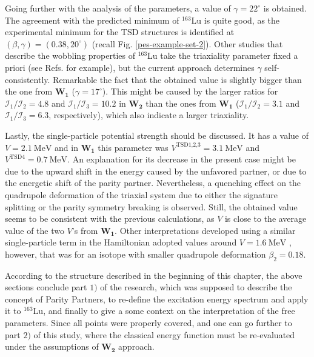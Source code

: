 Going further with the analysis of the parameters, a value of $\gamma=22^\circ$ is obtained. The agreement with the predicted minimum of $^{163}$Lu \cite{jensen2002wobbling,jensen2004coexisting} is quite good, as the experimental minimum for the TSD structures is identified at $(\beta,\gamma)=(0.38,20^\circ)$ (recall Fig. \ref{pes-example-set-2}). Other studies that describe the wobbling properties of $^{163}$Lu take the triaxiality parameter fixed a priori (see Refs. \cite{tanabe2006algebraic,tanabe2017stability} for example), but the current approach determines $\gamma$ self-consistently. Remarkable the fact that the obtained value is slightly bigger than the one from $\mathbf{W_1}$ ($\gamma=17^\circ$). This might be caused by the larger ratios for $\mathcal{I}_1/\mathcal{I}_2=4.8$ and $\mathcal{I}_1/\mathcal{I}_3=10.2$ in $\mathbf{W_2}$ than the ones from $\mathbf{W_1}$ ($\mathcal{I}_1/\mathcal{I}_2=3.1$ and $\mathcal{I}_1/\mathcal{I}_3=6.3$, respectively), which also indicate a larger triaxiality.

Lastly, the single-particle potential strength should be discussed. It has a value of $V=2.1\ \text{MeV}$ and in $\mathbf{W_1}$ this parameter was $V^{\text{TSD1,2,3}}=3.1\ \text{MeV}$ and $V^\text{TSD4}=0.7\ \text{MeV}$. An explanation for its decrease in the present case might be due to the upward shift in the energy caused by the unfavored partner, or due to the energetic shift of the parity partner. Nevertheless, a quenching effect on the quadrupole deformation of the triaxial system due to either the signature splitting or the parity symmetry breaking is observed. Still, the obtained value seems to be consistent with the previous calculations, as $V$ is close to the average value of the two $V$'s from $\mathbf{W_1}$. Other interpretations developed using a similar single-particle term in the Hamiltonian adopted values around $V=1.6\ \text{MeV}$ \cite{tanabe2017stability}, however, that was for an isotope with smaller quadrupole deformation $\beta_2=0.18$.

According to the structure described in the beginning of this chapter, the above sections conclude part $1)$ of the research, which was supposed to describe the concept of Parity Partners, to re-define the excitation energy spectrum and apply it to $^{163}$Lu, and finally to give a some context on the interpretation of the free parameters. Since all points were properly covered, and one can go further to part $2)$ of this study, where the classical energy function must be re-evaluated under the assumptions of $\mathbf{W_2}$ approach.


